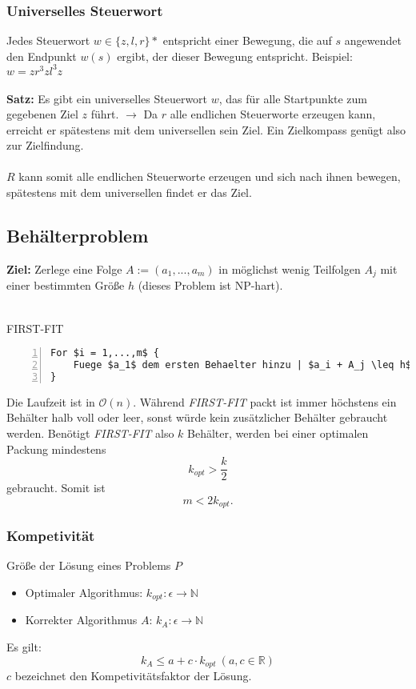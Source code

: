\subsubsection{Universelles Steuerwort}
Jedes Steuerwort \(w \in \{z,l,r\}*\) entspricht einer Bewegung, die auf \(s\) angewendet den Endpunkt \(w(s)\) ergibt, der dieser Bewegung entspricht. Beispiel: \(w = zr^3zl^3z\)
\\\\
\textbf{Satz:} Es gibt ein universelles Steuerwort \(w\), das für alle Startpunkte zum gegebenen Ziel \(z\) führt. \(\rightarrow \) Da \(r\) alle endlichen Steuerworte erzeugen kann, erreicht er spätestens mit dem universellen sein Ziel. Ein Zielkompass genügt also zur Zielfindung.
\\\\
\(R\) kann somit alle endlichen Steuerworte erzeugen und sich nach ihnen bewegen, spätestens mit dem universellen findet er das Ziel.

\subsection{Behälterproblem}
\textbf{Ziel:} Zerlege eine Folge \(A := (a_1,...,a_m)\) in möglichst wenig Teilfolgen \(A_j\) mit einer bestimmten Größe \(h\) (dieses Problem ist NP-hart).
\\\\
\begin{minipage}{\textwidth}
FIRST-FIT
\begin{lstlisting}[frame=single,numbers=left,mathescape]
For $i = 1,...,m$ {
	Fuege $a_1$ dem ersten Behaelter hinzu | $a_i + A_j \leq h$
}
\end{lstlisting}
\end{minipage}
Die Laufzeit ist in \(\mathcal{O}(n)\). Während \textit{FIRST-FIT} packt ist immer höchstens ein Behälter halb voll oder leer, sonst würde kein zusätzlicher Behälter gebraucht werden. Benötigt \textit{FIRST-FIT} also \(k\) Behälter, werden bei einer optimalen Packung mindestens
\[k_{opt} > \frac{k}{2}\]
gebraucht. Somit ist
\[m < 2k_{opt}.\]

\subsubsection{Kompetivität}
Größe der Lösung eines Problems \(P\)
\begin{itemize}
	\item Optimaler Algorithmus: \(k_{opt}: \epsilon \rightarrow \mathbb{N}\)
	\item Korrekter Algorithmus \(A\): \(k_A: \epsilon \rightarrow \mathbb{N}\)
\end{itemize}
Es gilt:
\[k_A \leq a+c\cdot k_{opt}~(a,c \in \mathbb{R})\]
\(c\) bezeichnet den Kompetivitätsfaktor der Lösung.


